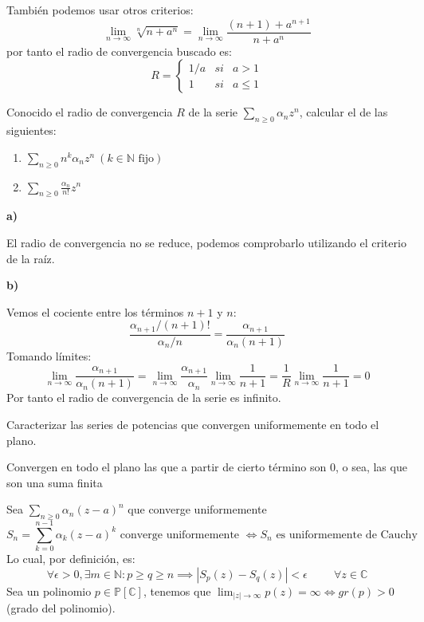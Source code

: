 También podemos usar otros criterios:
$$\lim_{n\rightarrow\infty} \sqrt[n]{n+a^n} = \lim_{n\rightarrow\infty} \frac{(n+1)+a^{n+1}}{n+a^n} $$
por tanto el radio de convergencia buscado es:
$$ R = \left\{ \begin{array}{lcc}
1/a &   si  & a>1 \\
1 &  si & a\leq 1
\end{array}
\right. $$


\begin{comment}
\textbf{f)}
$\sum_{n\geq 0} a^{n^2}z^n,a\in\mathbb{C}$
raíz n-esima 
\end{comment}



\begin{ejer}
	Conocido el radio de convergencia $R$ de la serie $\sum_{n\geq 0} \alpha_nz^n$, calcular el de las siguientes:
	\begin{enumerate}[label=(\alph*)]
		\item $\sum_{n\geq 0} n^k\alpha_nz^n \ (k\in\mathbb{N} \text{ fijo})$
		\item $\sum_{n\geq0} \frac{\alpha_n}{n!}z^n$	
	\end{enumerate}
\end{ejer}

\textbf{a)}

El radio de convergencia no se reduce, podemos comprobarlo utilizando el criterio de la raíz.

\textbf{b)}

Vemos el cociente entre los términos $n+1$ y $n$:
$$ \frac{\alpha_{n+1}/(n+1)!}{\alpha_n/n} = \frac{\alpha_{n+1}}{\alpha_n (n+1)}$$
Tomando límites:
$$ \lim_{n\rightarrow\infty} \frac{\alpha_{n+1}}{\alpha_n (n+1)} = \lim_{n\rightarrow\infty}\frac{\alpha_{n+1}}{\alpha_n}\lim_{n\rightarrow\infty}\frac{1}{n+1} = \frac{1}{R} \lim_{n\rightarrow\infty}\frac{1}{n+1} = 0$$
Por tanto el radio de convergencia de la serie es infinito.

\begin{ejer}
	Caracterizar las series de potencias que convergen uniformemente en todo el plano.
\end{ejer}
Convergen en todo el plano las que a partir de cierto término son 0, o sea, las que son una suma finita

Sea $\sum_{n\geq 0} \alpha_n (z-a)^n$ que converge uniformemente
$$S_n=\sum_{k=0}^{n-1} \alpha_k (z-a)^k \text{ \ converge uniformemente } \Longleftrightarrow S_n \text{ es uniformemente de Cauchy }$$
Lo cual, por definición, es:
$$\forall\epsilon>0,\exists m\in\mathbb{N}: p\geq q\geq n \implies |S_p(z)-S_q(z)| < \epsilon \hspace{1cm}\forall z\in\mathbb{C}$$
Sea un polinomio $p\in\mathbb{P}[\mathbb{C}]$, tenemos que $\lim_{|z|\rightarrow\infty} p(z) = \infty \Longleftrightarrow gr(p)>0$ (grado del polinomio).

